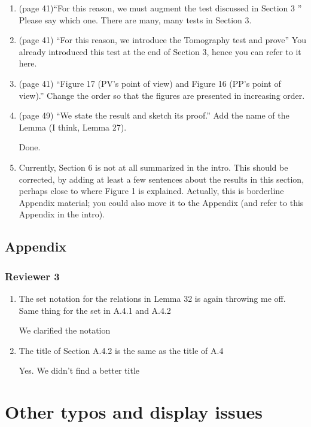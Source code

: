 \documentclass[12pt]{article}
\begin{document}
\begin{enumerate}
\item (page 41)``For this reason, we must
augment the test discussed in Section 3 '' Please say which one. There are many, many tests in Section 3.
\item (page 41) ``For this reason, we introduce the Tomography test and prove'' You already introduced this test at the end of Section 3, hence you can refer to it here.
\item (page 41) ``Figure 17 (PV’s point of view)
and Figure 16 (PP’s point of view).'' Change the order so that the figures are presented in increasing order.
\item (page 49) ``We state the result and sketch its proof.'' Add the name of the Lemma (I think, Lemma 27).

{\color{blue} Done.}

\item Currently, Section 6 is not at all summarized in the intro. This should be corrected, by adding at least a few sentences about the results in this section, perhaps close to where Figure 1 is explained. Actually, this is borderline Appendix material; you could also move it to the Appendix (and refer to this Appendix in the intro).
\end{enumerate}


\subsection*{Appendix}
\subsubsection*{Reviewer 3}
\begin{enumerate}
\item The set notation for the relations in Lemma 32 is again throwing me off. Same thing for the set in A.4.1 and A.4.2

{\color{blue} We clarified the notation} 

\item The title of Section A.4.2 is the same as the title of A.4

{\color{blue} Yes. We didn't find a better title} 

\end{enumerate}



\section*{Other typos and display issues}
\end{document}
